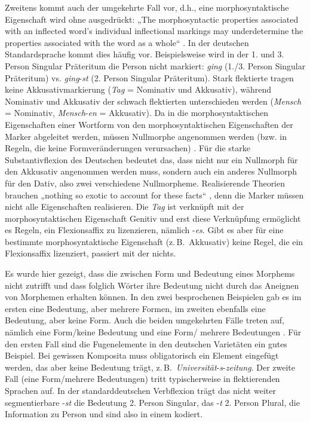 Zweitens kommt auch der umgekehrte Fall vor, d.h., eine morphosyntaktische Eigenschaft wird ohne  ausgedrückt: „The morphosyntactic properties associated with an inflected word’s individual inflectional markings may underdetermine the properties associated with the word as a whole“ \citep[7]{Stump2001}. In der deutschen Standardsprache kommt dies häufig vor. Beispielsweise wird in der 1. und 3. Person Singular Präteritum die Person nicht markiert: \textit{ging} (1./3. Person Singular Präteritum) vs. \textit{ging}-\textit{st} (2. Person Singular Präteritum). Stark flektierte  tragen keine Akkusativmarkierung (\textit{Tag} = Nominativ und Akkusativ), während Nominativ und Akkusativ der schwach flektierten  unterschieden werden (\textit{Mensch} = Nominativ, \textit{Mensch}-\textit{en} = Akkusativ). Da in  die morphosyntaktischen Eigenschaften einer Wortform von den morphosyntaktischen Eigenschaften der Marker abgeleitet werden, müssen Nullmorphe angenommen werden (bzw. in  Regeln, die keine Formveränderungen verursachen) \citep[7–9]{Stump2001}. Für die starke Substantivflexion des Deutschen bedeutet das, dass nicht nur ein Nullmorph für den Akkusativ angenommen werden muss, sondern auch ein anderes Nullmorph für den Dativ, also zwei verschiedene Nullmorpheme. Realisierende Theorien brauchen „nothing so exotic to account for these facts“ \citep[9]{Stump2001}, denn die Marker müssen nicht alle Eigenschaften realisieren. Die  \textit{Tag} ist verknüpft mit der morphosyntaktischen Eigenschaft Genitiv und erst diese Verknüpfung ermöglicht es Regeln, ein Flexionsaffix zu lizenzieren, nämlich -\textit{es}. Gibt es aber für eine bestimmte morphosyntaktische Eigenschaft (z.\,B.\ Akkusativ) keine Regel, die ein Flexionsaffix lizenziert, passiert mit der  nichts.

Es wurde hier gezeigt, dass die  zwischen Form und Bedeutung eines Morphems nicht zutrifft und dass folglich Wörter ihre Bedeutung nicht durch das Aneignen von Morphemen erhalten können. In den zwei besprochenen Beispielen gab es im ersten eine Bedeutung, aber mehrere Formen, im zweiten ebenfalls eine Bedeutung, aber keine Form. Auch die beiden umgekehrten Fälle treten auf, nämlich eine Form/keine Bedeutung und eine Form/ mehrere Bedeutungen \citep[80–82]{Spencer2004}. Für den ersten Fall sind die Fugenelemente in den deutschen Varietäten ein gutes Beispiel. Bei gewissen Komposita muss obligatorisch ein Element eingefügt werden, das aber keine Bedeutung trägt, z.\,B.\ \textit{Universität}-\textit{s}-\textit{zeitung}. Der zweite Fall (eine Form/mehrere Bedeutungen) tritt typischerweise in flektierenden Sprachen auf. In der standarddeutschen Verbflexion trägt das nicht weiter segmentierbare  -\textit{st} die Bedeutung 2. Person Singular, das  -\textit{t} 2. Person Plural, die Information zu Person und  sind also in einem  kodiert.

